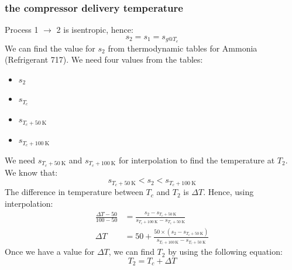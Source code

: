 \documentclass[12pt]{article}
\numberwithin{equation}{section}
\begin{document}
\begin{flushleft}
\subsubsection[Compressor delivery temperature.]{the compressor delivery temperature}
Process 1 $\rightarrow$ 2 is isentropic, hence:
\begin{equation}
  s_2 = s_1 = s_{g@T_e}
\end{equation}
We can find the value for $s_2$ from thermodynamic tables for Ammonia (Refrigerant 717). We need four values from the tables:
\begin{multicols}{2}
  \begin{itemize}
    \item $s_2$
    \item $s_{T_c}$
    \item $s_{T_c + 50 \ \si{\kelvin}}$
    \item $s_{T_c + 100 \ \si{\kelvin}}$
  \end{itemize}
\end{multicols}
We need $s_{T_c + 50 \ \si{\kelvin}}$ and $s_{T_c + 100 \ \si{\kelvin}}$ for interpolation to find the temperature at $T_2$. We know that:
\begin{equation}
  s_{T_c + 50 \ \si{\kelvin}} < s_2 < s_{T_c + 100 \ \si{\kelvin}}
\end{equation}
The difference in temperature between $T_c$ and $T_2$ is $\Delta T$. Hence, using interpolation:
\begin{align}
  \frac{\Delta T - 50}{100 -50} &= \frac{s_2 - s_{T_c + 50 \ \si{\kelvin}}}{s_{T_c + 100 \ \si{\kelvin}} - s_{T_c + 50 \ \si{\kelvin}}}\\
  \Delta T &= 50 + \frac{50 \times (s_2 - s_{T_c + 50 \ \si{\kelvin}})}{s_{T_c + 100 \ \si{\kelvin}} - s_{T_c + 50 \ \si{\kelvin}}}
\end{align}
Once we have a value for $\Delta T$, we can find $T_2$ by using the following equation:
\begin{equation}
  T_2 = T_c + \Delta T
\end{equation}

\end{flushleft}
\end{document}
